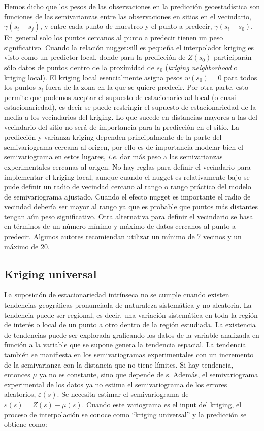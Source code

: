 \documentclass[11pt,b5paper,]{krantz}
\begin{document}
Hemos dicho que los pesos de las observaciones en la predicción geoestadística son funciones de las semivarianzas entre las observaciones en sitios en el vecindario, \(\gamma(s_i-s_j)\), y entre cada punto de muestreo y el punto a predecir, \(\gamma(s_i-s_0)\). En general solo los puntos cercanos al punto a predecir tienen un peso significativo. Cuando la relación nugget:sill es pequeña el interpolador kriging es visto como un predictor local, donde para la predicción de \(Z(s_0)\) participarán sólo datos de puntos dentro de la proximidad de \(s_0\) (\emph{kriging neighborhood} o kriging local). El kriging local esencialmente asigna pesos \(w(s_0)=0\) para todos los puntos \(s_i\) fuera de la zona en la que se quiere predecir. Por otra parte, esto permite que podemos aceptar el supuesto de estacionariedad local (o cuasi estacionariedad), es decir se puede restringir el supuesto de estacionariedad de la media a los vecindarios del kriging. Lo que sucede en distancias mayores a las del vecindario del sitio no será de importancia para la predicción en el sitio. La predicción y varianza kriging dependen principalmente de la parte del semivariograma cercana al origen, por ello es de importancia modelar bien el semivariograma en estos lugares, \emph{i.e.} dar más peso a las semivarianzas experimentales cercanas al origen. No hay reglas para definir el vecindario para implementar el kriging local, aunque cuando el nugget es relativamente bajo se pude definir un radio de vecindad cercano al rango o rango práctico del modelo de semivariograma ajustado. Cuando el efecto nugget es importante el radio de vecindad debería ser mayor al rango ya que es probable que puntos más distantes tengan aún peso significativo. Otra alternativa para definir el vecindario se basa en términos de un número mínimo y máximo de datos cercanos al punto a predecir. Algunos autores recomiendan utilizar un mínimo de 7 vecinos y un máximo de 20.

\hypertarget{kriging-universal}{%
\subsection{Kriging universal}\label{kriging-universal}}

La suposición de estacionariedad intrínseca no se cumple cuando existen tendencias geográficas pronunciada de naturaleza sistemática y no aleatoria. La tendencia puede ser regional, es decir, una variación sistemática en toda la región de interés o local de un punto a otro dentro de la región estudiada. La existencia de tendencias puede ser explorada graficando los datos de la variable analizada en función a la variable que se supone genera la tendencia espacial. La tendencia también se manifiesta en los semivariogramas experimentales con un incremento de la semivarianza con la distancia que no tiene límites. Si hay tendencia, entonces \(\mu\) ya no es constante, sino que depende de s. Además, el semivariograma experimental de los datos ya no estima el semivariograma de los errores aleatorios, \(\varepsilon(s)\). Se necesita estimar el semivariograma de \(\varepsilon(s) = Z (s) - \mu(s)\). Cuando este variograma es el input del kriging, el proceso de interpolación se conoce como ``kriging universal'' y la predicción se obtiene como:
\end{document}
